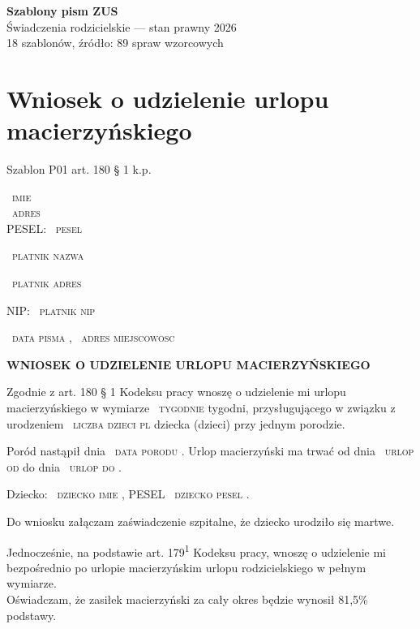 \documentclass[11pt,a4paper]{article}
\newcommand{\Pole}[1]{%
  \textcolor{szary}{\dotfill}\,%
  {\scriptsize\textcolor{szary}{\textsc{#1}}}%
}
\newenvironment{warunek}[1]{%
  \par\smallskip\noindent\begin{minipage}{\linewidth}%
  \color{black}%
}{%
  \end{minipage}\par\smallskip%
}
\newcommand{\NaglowekPisma}[1]{%
  \par\vspace{0.8em}%
  \begin{center}%
    {\large\bfseries\MakeUppercase{#1}}%
  \end{center}%
  \vspace{0.4em}%
}
\begin{document}
\begin{center}
{\LARGE\bfseries Szablony pism ZUS}\\[4pt]
{\large Świadczenia rodzicielskie --- stan prawny 2026}\\[2pt]
{\small\color{szary}18 szablonów, źródło: 89 spraw wzorcowych}
\end{center}


\tableofcontents
\clearpage


\section{Wniosek o udzielenie urlopu macierzyńskiego}

{\small\color{szary}Szablon P01 \textbullet{} art. 180 \S{} 1 k.p.}

\Pole{imie}\\[-2pt]
\Pole{adres}\\[-2pt]
PESEL: \Pole{pesel}

\Pole{platnik nazwa}
\Pole{platnik adres}
NIP: \Pole{platnik nip}

\Pole{data pisma}, \Pole{adres miejscowosc}

\NaglowekPisma{WNIOSEK O UDZIELENIE URLOPU MACIERZYŃSKIEGO}

Zgodnie z art. 180 \S{} 1 Kodeksu pracy wnoszę o udzielenie mi urlopu
macierzyńskiego w wymiarze \Pole{tygodnie} tygodni, przysługującego w związku
z urodzeniem \Pole{liczba dzieci pl} dziecka (dzieci) przy jednym porodzie.

Poród nastąpił dnia \Pole{data porodu}.
Urlop macierzyński ma trwać od dnia \Pole{urlop od} do dnia \Pole{urlop do}.

\begin{warunek}{jesli_dziecko}
Dziecko: \Pole{dziecko imie}, PESEL \Pole{dziecko pesel}.
\end{warunek}

\begin{warunek}{jesli_martwe}
Do wniosku załączam zaświadczenie szpitalne, że dziecko urodziło się martwe.
\end{warunek}

\begin{warunek}{jesli_pelny_wymiar}
Jednocześnie, na podstawie art. 179\textsuperscript{1} Kodeksu pracy, wnoszę o udzielenie mi\\[-2pt]
bezpośrednio po urlopie macierzyńskim urlopu rodzicielskiego w pełnym wymiarze.\\[-2pt]
Oświadczam, że zasiłek macierzyński za cały okres będzie wynosił 81,5\% podstawy.
\end{warunek}
\end{document}
